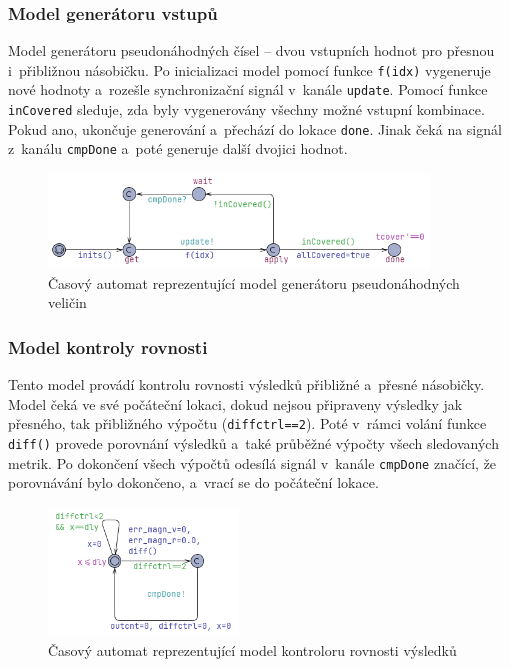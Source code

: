 \subsubsection{Model generátoru vstupů}
Model generátoru pseudonáhodných čísel -- dvou vstupních hodnot pro přesnou i~přibližnou násobičku. Po inicializaci model pomocí funkce \texttt{f(idx)} vygeneruje nové hodnoty a~rozešle synchronizační signál v~kanále \texttt{update}. Pomocí funkce \texttt{inCovered} sleduje, zda byly vygenerovány všechny možné vstupní kombinace. Pokud ano, ukončuje generování a~přechází do lokace \texttt{done}. Jinak čeká na signál z~kanálu \texttt{cmpDone} a~poté generuje další dvojici hodnot.

\begin{figure}[H]
    \centering
    \includegraphics[width=0.9\textwidth]{obrazky-figures/model_tmul2_tb_random.png}
    \caption{Časový automat reprezentující model generátoru pseudonáhodných veličin}
    \label{fig:model_tmul2_tb_random}
\end{figure}

\subsubsection{Model kontroly rovnosti}
Tento model provádí kontrolu rovnosti výsledků přibližné a~přesné násobičky. Model čeká ve své počáteční lokaci, dokud nejsou připraveny výsledky jak přesného, tak přibližného výpočtu (\texttt{diffctrl==2}). Poté v~rámci volání funkce \texttt{diff()} provede porovnání výsledků a~také průběžné výpočty všech sledovaných metrik. Po dokončení všech výpočtů odesílá signál v~kanále \texttt{cmpDone} značící, že porovnávání bylo dokončeno, a~vrací se do počáteční lokace.

\begin{figure}[H]
    \centering
    \includegraphics[width=0.45\textwidth]{obrazky-figures/model_eval_diff.png}
    \caption{Časový automat reprezentující model kontroloru rovnosti výsledků}
    \label{fig:model_eval_diff}
\end{figure}

